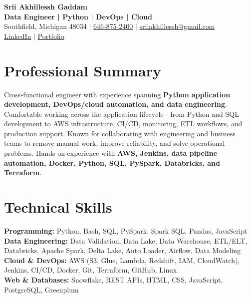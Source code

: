 \documentclass[letterpaper,10pt]{article}
\begin{document}
\fontsize{9.35pt}{10.45pt}\selectfont

\begin{center}
    {\LARGE \textbf{Srii Akhillessh Gaddam}} \\[-1pt]
    \textbf{Data Engineer | Python | DevOps | Cloud} \\[2pt]
    Southfield, Michigan 48034 $|$
    \href{tel:6468752400}{646-875-2400} $|$
    \href{mailto:sriiakhillessh@gmail.com}{sriiakhillessh@gmail.com} \\[1pt]
    \href{https://www.linkedin.com/in/srii-akhiilessh-gaddam-b48668191/}{LinkedIn} $|$
    \href{https://sriiakhillesshg.github.io/portfolio/}{Portfolio}
\end{center}
\vspace{-8pt}

\section{Professional Summary}
\small{Cross-functional engineer with experience spanning \textbf{Python application development, DevOps/cloud automation, and data engineering}. Comfortable working across the application lifecycle - from Python and SQL development to AWS infrastructure, CI/CD, monitoring, ETL workflows, and production support. Known for collaborating with engineering and business teams to remove manual work, improve reliability, and solve operational problems. Hands-on experience with \textbf{AWS, Jenkins, data pipeline automation, Docker, Python, SQL, PySpark, Databricks, and Terraform}.}

\section{Technical Skills}
\small{
\textbf{Programming:} Python, Bash, SQL, PySpark, Spark SQL, Pandas, JavaScript \\
\textbf{Data Engineering:} Data Validation, Data Lake, Data Warehouse, ETL/ELT, Databricks, Apache Spark, Delta Lake, Auto Loader, Airflow, Data Modeling \\
\textbf{Cloud \& DevOps:} AWS (S3, Glue, Lambda, Redshift, IAM, CloudWatch), Jenkins, CI/CD, Docker, Git, Terraform, GitHub, Linux \\
\textbf{Web \& Databases:} Snowflake, REST APIs, HTML, CSS, JavaScript, PostgreSQL, Greenplum
}
\end{document}
